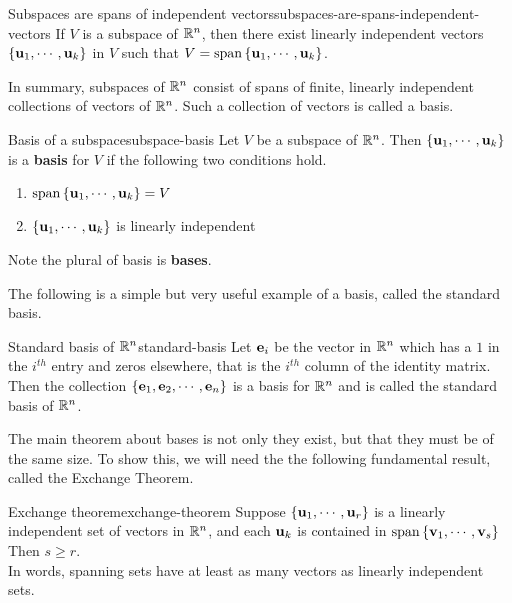 \begin{corollary}{Subspaces are spans of independent vectors}{subspaces-are-spans-independent-vectors}
  If $V$ is a subspace of $\mathbb{R}^{n}$, then there exist linearly
  independent vectors $\left\{\mbox{\bf u}_{1},\cdots ,\mbox{\bf u}_{k}\right\}$ in $V$
  such that $V=\sspan\set{\vect{u}_{1},\cdots ,\vect{u}_{k}}$.
\end{corollary}

In summary, subspaces of $\mathbb{R}^{n}$ consist of spans of finite, linearly
independent collections of vectors of $\mathbb{R}^{n}$.  Such a collection of
vectors is called a basis.

\begin{definition}{Basis of a subspace}{subspace-basis}
  Let $V$ be a subspace of $\mathbb{R}^{n}$. Then
  $\left\{ \mbox{\bf u}_{1},\cdots ,\mbox{\bf u}_{k}\right\} $ is a \textbf{basis} for
  $V$ if the following two conditions
  hold.

  \begin{enumerate}
  \item $\sspan\set{\vect{u}_{1},\cdots ,\vect{u}_{k}} =V$
  \item $\left\{\mbox{\bf u}_{1},\cdots ,\mbox{\bf u}_{k}\right\} $ is linearly
    independent
  \end{enumerate}

  Note the plural of basis is \textbf{bases}. 
\end{definition}

The following is a simple but very useful example of a basis, called
the standard basis.

\begin{definition}{Standard basis of $\mathbb{R}^n$}{standard-basis}
  Let $\mbox{\bf e}_i$ be the vector in $\mathbb{R}^n$ which has a $1$ in the
  $i^{th}$ entry and zeros elsewhere, that is the $i^{th}$ column of
  the identity matrix. Then the collection
  $\left\{\mbox{\bf e}_1, \mbox{\bf e}_2, \cdots, \mbox{\bf e}_n \right\}$ is a basis for
  $\mathbb{R}^n$ and is called the standard basis of
  $\mathbb{R}^n$.
\end{definition}

The main theorem about bases is not only they exist, but that they
must be of the same size. To show this, we will need the the following
fundamental result, called the Exchange Theorem.

\begin{theorem}{Exchange theorem}{exchange-theorem}
  Suppose $\left\{\mbox{\bf u}_{1},\cdots ,\mbox{\bf u}_{r}\right\} $ is a linearly
  independent set of vectors in $\mathbb{R}^n$, and each $\mbox{\bf u}_{k}$ is
  contained in $\sspan\set{\vect{v}_{1},\cdots
    ,\vect{v}_{s}}$ Then $s\geq r$. \\
  In words, spanning sets have at least as
  many vectors as linearly independent sets.
\end{theorem}

